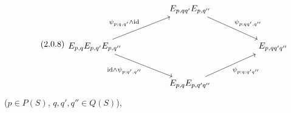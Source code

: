 \begin{equation}\tag{2.0.8}
\begin{tikzcd}[column sep=huge, row sep=large]
 & E_{p,qq'}E_{p,q''} \arrow[rd, "{\psi_{p;qq',q''}}"] & \\
E_{p,q}E_{p,q'}E_{p,q''} \arrow[ru, "{\psi_{p;q,q'}\wedge \mathrm{id}}"] \arrow[rd, "{\mathrm{id}\wedge\psi_{p;q',q''}}"'] & & E_{p,qq'q''} \\
 & E_{p,q}E_{p,q'q''} \arrow[ru, "\psi_{p;q;q'q''}"'] &
\end{tikzcd}
\end{equation}
($p \in P(S)$, $q,q',q'' \in Q(S)$),

